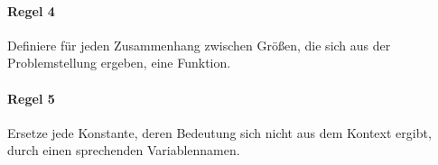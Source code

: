 \documentclass[../main.tex]{subfiles}
\begin{document}
        \paragraph{Regel 4}
            Definiere für jeden Zusammenhang zwischen Größen, die sich aus der Problemstellung ergeben,  eine Funktion.
            
        \paragraph{Regel 5}
            Ersetze jede Konstante, deren Bedeutung sich nicht aus dem Kontext ergibt, durch einen sprechenden Variablennamen.
\end{document}
